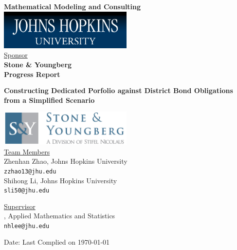 \documentclass[oneside,12pt]{report}
\begin{document}
\def\thefootnote{\fnsymbol{footnote}}

\thispagestyle{empty}

\def\shiftdowna{0.32in}  %
\def\shiftdownb{0.22in}  %


\begin{center}
\textbf{{\large Mathematical Modeling and Consulting }}\\

\vspace \shiftdowna
\includegraphics[width=0.5\textwidth]{jhu.png}\\

\vspace \shiftdowna
\underline {Sponsor}\\ 
\vspace{5pt}
\textbf{\large Stone \& Youngberg} \\
\vspace\shiftdowna
\textbf{{Progress Report}}

\vspace \shiftdowna
\textbf{{\Large Constructing Dedicated Porfolio against District Bond Obligations from a Simplified Scenario}}

\vspace \shiftdowna
\includegraphics[width=0.5\textwidth]{stone.jpeg}\\
\vspace{0.35in}
\underline {Team Members}\\
\vspace{5pt}
Zhenhan Zhao, Johns Hopkins University\\
\texttt{zzhao13@jhu.edu} \\
\vspace{10pt}
Shihong Li, Johns Hopkins University\\
\texttt{sli50@jhu.edu}

\vspace \shiftdownb
\underline {Supervisor} \\
\vspace{5pt}
, Applied Mathematics and Statistics\\
\texttt{nhlee@jhu.edu}


\vspace \shiftdowna
Date: Last Complied on \today

\end{center}
\end{document}
